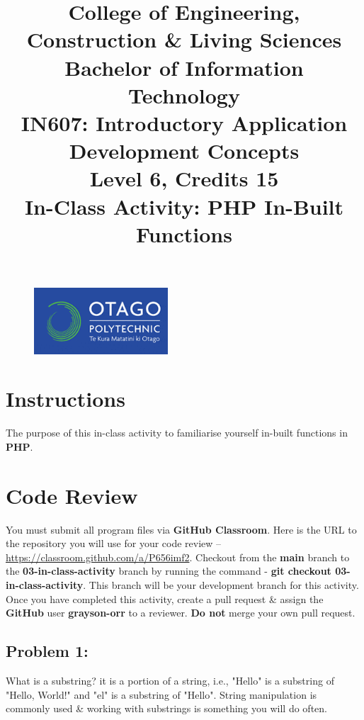 \documentclass{article}
\author{}
\begin{document}
\begin{figure}
    \centering
    \includegraphics[width=50mm]{../img/logo.png}
\end{figure}

\title{College of Engineering, Construction \& Living Sciences\\Bachelor of Information Technology\\IN607: Introductory Application Development Concepts\\Level 6, Credits 15\\\textbf{In-Class Activity: PHP In-Built Functions}}
\date{}
\maketitle
 
\section*{Instructions}
The purpose of this in-class activity to familiarise yourself in-built functions in \textbf{PHP}.

\section*{Code Review}
You must submit all program files via \textbf{GitHub Classroom}. Here is the URL to the repository you will use for your code review – \href{https://classroom.github.com/a/P656imf2}{https://classroom.github.com/a/P656imf2}. Checkout from the \textbf{main} branch to the \textbf{03-in-class-activity} branch by running the command - \textbf{git checkout 03-in-class-activity}. This branch will be your development branch for this activity. Once you have completed this activity, create a pull request \& assign the \textbf{GitHub} user \textbf{grayson-orr} to a reviewer. \textbf{Do not} merge your own pull request.

\subsection*{Problem 1:}
What is a substring? it is a portion of a string, i.e., "Hello" is a substring of "Hello, World!" and "el" is a substring of "Hello". String manipulation is commonly used \& working with substrings is something you will do often. \\
\end{document}
